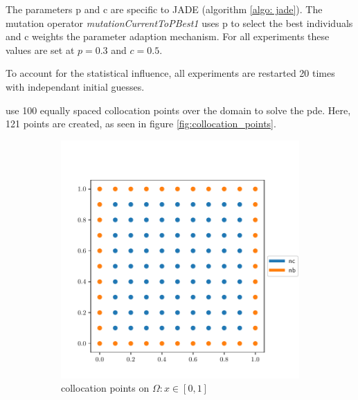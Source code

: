 \documentclass[./\jobname.tex]{subfiles}
\begin{document}
The parameters p and c are specific to JADE (algorithm \ref{algo: jade}). The mutation operator \textit{mutationCurrentToPBest1} uses p to select the best individuals and c weights the parameter adaption mechanism. For all experiments these values are set at $p=0.3$ and $c=0.5$. 

To account for the statistical influence, all experiments are restarted 20 times with independant initial guesses. 

\cite{chaquet_using_2019} use 100 equally spaced collocation points over the domain to solve the \gls{pde}. Here, 121 points are created, as seen in figure \ref{fig:collocation_points}. 

\begin{figure}[h]
	\centering
	\begin{subfigure}[b]{0.5\linewidth}
		\centering
		\includegraphics[width=1\textwidth]{../img/pdf/testbed_small_domain.pdf}
		\caption{collocation points on $\Omega: x\in [0,1]$}
		\label{fig:collocation_points_domain_small}
	\end{subfigure}%
	\begin{subfigure}[b]{0.5\linewidth}
		\centering

\end{subfigure}
\end{figure}
\end{document}
